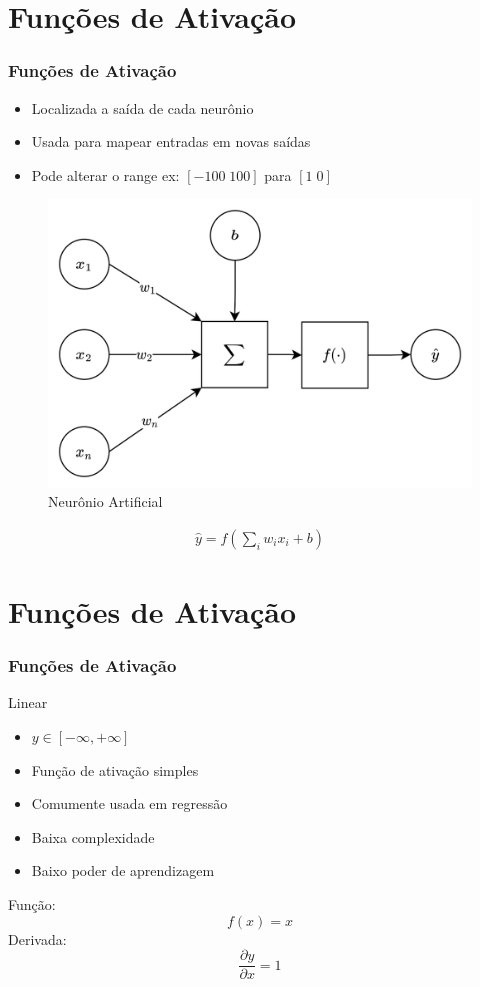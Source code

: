 \documentclass{beamer}
\begin{document}
\section{Funções de Ativação}
\begin{frame}
	\frametitle{Funções de Ativação}
	\begin{itemize}
		\item Localizada a saída de cada neurônio
		\item Usada para mapear entradas em novas saídas
		\item Pode alterar o range ex: $[-100 \; 100]$ para $[1 \; 0]$
	\end{itemize}
	\begin{figure}
		\centering
		\includegraphics[width=0.4\linewidth]{figures/neuron_ai}
		\caption{Neurônio Artificial}
	\end{figure}
	
	\begin{gather*}
		\hat{y} = f( \sum_i w_i x_i + b)
	\end{gather*}
\end{frame}

\section{Funções de Ativação}
\begin{frame}
	\frametitle{Funções de Ativação}
	\begin{block}{Linear}
		\begin{itemize}
			\item $y \in [- \infty, + \infty]$
			\item Função de ativação simples
			\item Comumente usada em regressão
			\item Baixa complexidade
			\item Baixo poder de aprendizagem
		\end{itemize}
	Função:
			$$f(x) = x$$
	Derivada: 	$$\frac{\partial y}{\partial x} = 1$$
	
	\end{block}
\end{frame}
\end{document}
